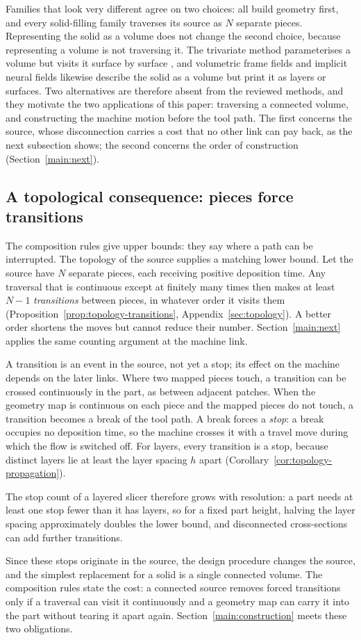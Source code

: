 Families that look very different agree on two choices: all build geometry first, and every solid-filling family traverses its source as $N$ separate pieces. Representing the solid as a volume does not change the second choice, because representing a volume is not traversing it. The trivariate method parameterises a volume but visits it surface by surface \cite{ezair2018volumetric}, and volumetric frame fields \cite{chermain2025atomizer} and implicit neural fields \cite{dutta2025implicit} likewise describe the solid as a volume but print it as layers or surfaces. Two alternatives are therefore absent from the reviewed methods, and they motivate the two applications of this paper: traversing a connected volume, and constructing the machine motion before the tool path. The first concerns the source, whose disconnection carries a cost that no other link can pay back, as the next subsection shows; the second concerns the order of construction (Section~\ref{main:next}).

\subsection{A topological consequence: pieces force transitions}
\label{main:source}
The composition rules give upper bounds: they say where a path can be interrupted. The topology of the source supplies a matching lower bound. Let the source have $N$ separate pieces, each receiving positive deposition time. Any traversal that is continuous except at finitely many times then makes at least $N-1$ \emph{transitions} between pieces, in whatever order it visits them (Proposition~\ref{prop:topology-transitions}, Appendix~\ref{sec:topology}). A better order shortens the moves but cannot reduce their number. Section~\ref{main:next} applies the same counting argument at the machine link.

A transition is an event in the source, not yet a stop; its effect on the machine depends on the later links. Where two mapped pieces touch, a transition can be crossed continuously in the part, as between adjacent patches. When the geometry map is continuous on each piece and the mapped pieces do not touch, a transition becomes a break of the tool path. A break forces a \emph{stop}: a break occupies no deposition time, so the machine crosses it with a travel move during which the flow is switched off. For layers, every transition is a stop, because distinct layers lie at least the layer spacing $h$ apart (Corollary~\ref{cor:topology-propagation}).

The stop count of a layered slicer therefore grows with resolution: a part needs at least one stop fewer than it has layers, so for a fixed part height, halving the layer spacing approximately doubles the lower bound, and disconnected cross-sections can add further transitions.

Since these stops originate in the source, the design procedure changes the source, and the simplest replacement for a solid is a single connected volume. The composition rules state the cost: a connected source removes forced transitions only if a traversal can visit it continuously and a geometry map can carry it into the part without tearing it apart again. Section~\ref{main:construction} meets these two obligations.
